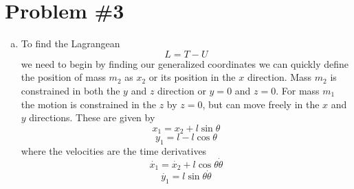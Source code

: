 \documentclass[11pt]{article}
\numberwithin{equation}{section}
\begin{document}
\section{Problem \#3}
\begin{enumerate}[(a)]
\item 
To find the Lagrangean
\begin{equation}
L = T - U
\label{lagran}
\end{equation}
we need to begin by finding our generalized coordinates we can quickly define the position of mass $m_2$ as $x_2$ or its position in the $x$ direction. Mass $m_2$ is constrained in both the $y$ and $z$ direction or $y=0$ and $z=0$. For mass $m_1$ the motion is constrained in the $z$ by $z=0$, but can move freely in the $x$ and $y$ directions. These are given by
$$x_1 = x_2 + l\sin{\theta}$$
$$y_1 = l - l\cos{\theta}$$
where the velocities are the time derivatives 
$$\dot{x_1} = \dot{x_2} + l\cos{\theta}\dot{\theta}$$
$$\dot{y_1} = l\sin{\theta}\dot{\theta}$$


\end{enumerate}
\end{document}
